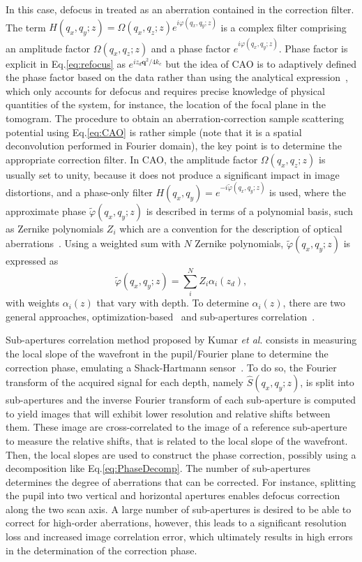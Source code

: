 In this case, defocus in treated as an aberration contained in the correction filter. The term $H(q_x, q_y; z) = \Omega(q_x,q_z;z) e^{i\varphi(q_x, q_y; z)}$ is a complex filter comprising an amplitude factor $\Omega(q_x,q_z;z)$ and a phase factor $e^{i\varphi(q_x, q_y; z)}$. Phase factor is explicit in Eq.\eqref{eq:refocus} as $e^{iz_d\mathbf{q}^2/4k_c}$ but the idea of CAO is to adaptively defined the phase factor based on the data rather than using the analytical expression~\cite{Adie2012_Computational}, which only accounts for defocus and requires precise knowledge of physical quantities of the system, for instance, the location of the focal plane in the tomogram. The procedure to obtain an aberration-correction sample scattering potential using Eq.\eqref{eq:CAO} is rather simple (note that it is a spatial deconvolution performed in Fourier domain), the key point is to determine the appropriate correction filter. In CAO, the amplitude factor $\Omega(q_x,q_z;z)$ is usually set to unity, because it does not produce a significant impact in image distortions, and a phase-only filter $H(q_x,q_y)=e^{-i\tilde{\varphi}(q_x, q_y; z)}$ is used, where the approximate phase $\tilde{\varphi}(q_x, q_y; z)$ is described in terms of a polynomial basis, such as Zernike polynomials $Z_i$ which are a convention for the description of optical aberrations~\cite{Malacara2007_Optical, Lakshminarayanan2011_Zernike}. Using a weighted sum with $N$ Zernike polynomials, $\tilde{\varphi}(q_x, q_y; z)$ is expressed as
\begin{equation}\label{eq:PhaseDecomp}
	\tilde{\varphi}(q_x, q_y; z) = \sum_i^N Z_i\alpha_i(z_d),
\end{equation} 
with weights $\alpha_i(z)$ that vary with depth. To determine $\alpha_i(z)$, there are two general approaches, optimization-based~\cite{Adie2012_Computational} and sub-apertures correlation~\cite{Kumar2013_Subaperture}.

Sub-apertures correlation method proposed by Kumar \textit{et al}. consists in measuring the local slope of the wavefront in the pupil/Fourier plane to determine the correction phase, emulating a Shack-Hartmann sensor~\cite{Kumar2013_Subaperture}. To do so, the Fourier transform of the acquired signal for each depth, namely $\hat{S}(q_x, q_y; z)$, is split into sub-apertures and the inverse Fourier transform of each sub-aperture is computed to yield images that will exhibit lower resolution and relative shifts between them. These image are cross-correlated to the image of a reference sub-aperture to measure the relative shifts, that is related to the local slope of the wavefront. Then, the local slopes are used to construct the phase correction, possibly using a decomposition like Eq.\eqref{eq:PhaseDecomp}. The number of sub-apertures determines the degree of aberrations that can be corrected. For instance, splitting the pupil into two vertical and horizontal apertures enables defocus correction along the two scan axis. A large number of sub-apertures is desired to be able to correct for high-order aberrations, however, this leads to a significant resolution loss and increased image correlation error, which ultimately results in high errors in the determination of the correction phase.

